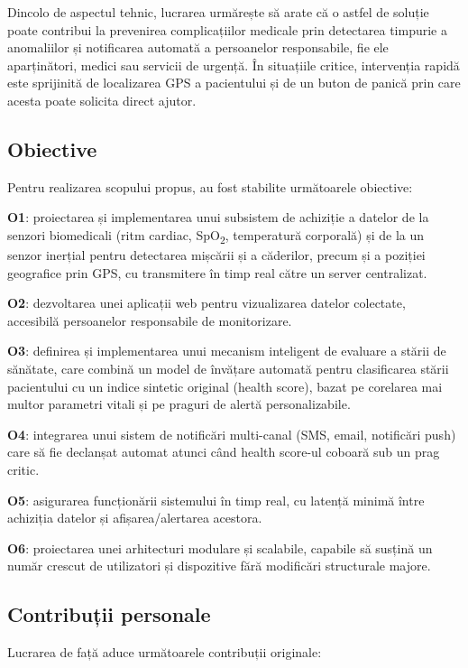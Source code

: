 ﻿\documentclass[12pt,a4paper,twoside]{article}
\newcommand{\spo}{SpO\textsubscript{2}}
\begin{document}
Dincolo de aspectul tehnic, lucrarea urmărește să arate că o astfel de soluție poate contribui la prevenirea complicațiilor medicale prin detectarea timpurie a anomaliilor și notificarea automată a persoanelor responsabile, fie ele aparținători, medici sau servicii de urgență. În situațiile critice, intervenția rapidă este sprijinită de localizarea GPS a pacientului și de un buton de panică prin care acesta poate solicita direct ajutor.

\subsection{Obiective}

Pentru realizarea scopului propus, au fost stabilite următoarele obiective:

\textbf{O1}: proiectarea și implementarea unui subsistem de achiziție a datelor de la senzori biomedicali (ritm cardiac, \spo, temperatură corporală) și de la un senzor inerțial pentru detectarea mișcării și a căderilor, precum și a poziției geografice prin GPS, cu transmitere în timp real către un server centralizat.

\textbf{O2}: dezvoltarea unei aplicații web pentru vizualizarea datelor colectate, accesibilă persoanelor responsabile de monitorizare.

\textbf{O3}: definirea și implementarea unui mecanism inteligent de evaluare a stării de sănătate, care combină un model de învățare automată pentru clasificarea stării pacientului cu un indice sintetic original (health score), bazat pe corelarea mai multor parametri vitali și pe praguri de alertă personalizabile.

\textbf{O4}: integrarea unui sistem de notificări multi-canal (SMS, email, notificări push) care să fie declanșat automat atunci când health score-ul coboară sub un prag critic.

\textbf{O5}: asigurarea funcționării sistemului în timp real, cu latență minimă între achiziția datelor și afișarea/alertarea acestora.

\textbf{O6}: proiectarea unei arhitecturi modulare și scalabile, capabile să susțină un număr crescut de utilizatori și dispozitive fără modificări structurale majore.

\subsection{Contribuții personale}

Lucrarea de față aduce următoarele contribuții originale:
\end{document}

